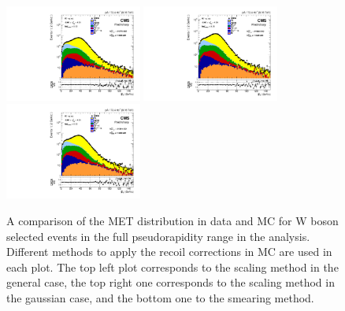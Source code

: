 \begin{figure}[!h]
\begin{center}
\includegraphics[width=0.4\textwidth]{Figures/WBoson/Analysis/Correction/Recoil/CheckFits/W/Recoil_ScalingGeneral/PLOT_MET_DATA_WToMuMi_PA_Model_TEMP_WDYDYToTauWToTauTTbar_ModifiedRayleigh_QCD_MuEtaCM_m286_193_MuIso_0_15.pdf}
\includegraphics[width=0.4\textwidth]{Figures/WBoson/Analysis/Correction/Recoil/CheckFits/W/Recoil_ScalingGauss/PLOT_MET_DATA_WToMuMi_PA_Model_TEMP_WDYDYToTauWToTauTTbar_ModifiedRayleigh_QCD_MuEtaCM_m286_193_MuIso_0_15.pdf} \\
\includegraphics[width=0.4\textwidth]{Figures/WBoson/Analysis/Correction/Recoil/CheckFits/W/Recoil_Smearing/PLOT_MET_DATA_WToMuMi_PA_Model_TEMP_WDYDYToTauWToTauTTbar_ModifiedRayleigh_QCD_MuEtaCM_m286_193_MuIso_0_15.pdf}
\caption{A comparison of the MET distribution in data and MC for W boson selected events in the full pseudorapidity range in the analysis. Different methods to apply the recoil corrections in MC are used in each plot. The top left plot corresponds to the scaling method in the general case, the top right one corresponds to the scaling method in the gaussian case, and the bottom one to the smearing method.}
\label{fig:recoilCorrWreg}
\end{center}
\end{figure}

\clearpage


